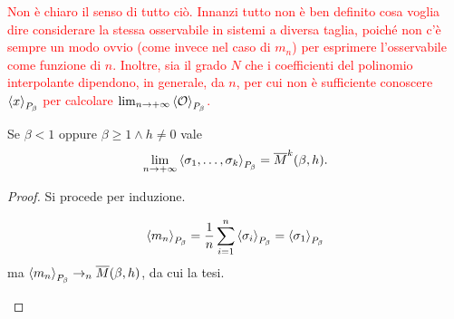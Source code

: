\textcolor{red}{
    Non è chiaro il senso di tutto ciò. Innanzi tutto non è ben definito cosa voglia dire considerare la stessa osservabile in sistemi a diversa taglia, poiché non c'è sempre un modo ovvio (come invece nel caso di $ m_n $) per esprimere l'osservabile come funzione di $ n $.
    Inoltre, sia il grado $ N $ che i coefficienti del polinomio interpolante dipendono, in generale, da $ n $, per cui non è sufficiente conoscere $ \left< x \right>_{P_\beta} $ per calcolare $ \lim_{n \to +\infty} \left< \mathcal{O} \right>_{P_\beta} $.
}

\begin{thm}
    Se $ \beta < 1 $ oppure $ \beta \geq 1 \wedge h \neq 0 $ vale
    \[ \lim_{n \to +\infty} \left< \sigma_1, \ldots, \sigma_k \right>_{P_\beta} = \overline{M}^k(\beta, h). \]
\end{thm}
\begin{proof}
    Si procede per induzione.
\begin{pbase}
    \[ \left< m_n \right>_{P_\beta} = \frac{1}{n} \sum_{i=1}^{n}\left< \sigma_i \right>_{P_\beta} = \left< \sigma_1 \right>_{P_\beta} \]
    ma $ \left< m_n \right>_{P_\beta} \to_n \overline{M}(\beta,h) $, da cui la tesi.
\end{pbase}
\begin{pind}


\end{pind}
\end{proof}
